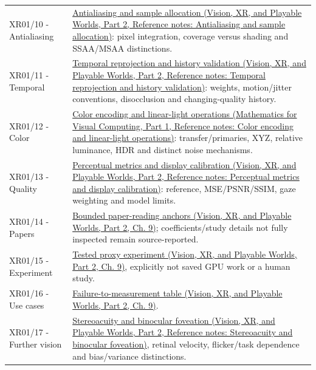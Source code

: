 {\begin{longtable}[]{@{}
  >{\raggedright\arraybackslash}p{}
  >{\raggedright\arraybackslash}p{}@{}}
XR01/10 - Antialiasing & \href{../07-Vision-XR-and-Playable-Worlds-P02/main.pdf\#appendix-4192b2bdd21e}{Antialiasing and sample allocation (Vision, XR, and Playable Worlds, Part 2, Reference notes: Antialiasing and sample allocation)}: pixel integration, coverage versus shading and SSAA/MSAA distinctions. \\
XR01/11 - Temporal & \href{../07-Vision-XR-and-Playable-Worlds-P02/main.pdf\#appendix-0727340a4428}{Temporal reprojection and history validation (Vision, XR, and Playable Worlds, Part 2, Reference notes: Temporal reprojection and history validation)}: weights, motion/jitter conventions, disocclusion and changing-quality history. \\
XR01/12 - Color & \href{../02-Mathematics-for-Visual-Computing-P01/main.pdf\#appendix-a9f83ad40792}{Color encoding and linear-light operations (Mathematics for Visual Computing, Part 1, Reference notes: Color encoding and linear-light operations)}: transfer/primaries, XYZ, relative luminance, HDR and distinct noise mechanisms. \\
XR01/13 - Quality & \href{../07-Vision-XR-and-Playable-Worlds-P02/main.pdf\#appendix-b2c1846508bf}{Perceptual metrics and display calibration (Vision, XR, and Playable Worlds, Part 2, Reference notes: Perceptual metrics and display calibration)}: reference, MSE/PSNR/SSIM, gaze weighting and model limits. \\
XR01/14 - Papers & \href{../07-Vision-XR-and-Playable-Worlds-P02/main.pdf\#04-visual-computing-ii-ch042-read-research-as-a-chain-of-questions-methods-and-bounded-conclusions}{Bounded paper-reading anchors (Vision, XR, and Playable Worlds, Part 2, Ch. 9)}; coefficients/study details not fully inspected remain source-reported. \\
XR01/15 - Experiment & \href{../07-Vision-XR-and-Playable-Worlds-P02/main.pdf\#04-visual-computing-ii-ch042-complete-numerical-and-image-space-laboratory}{Tested proxy experiment (Vision, XR, and Playable Worlds, Part 2, Ch. 9)}, explicitly not saved GPU work or a human study. \\
XR01/16 - Use cases & \href{../07-Vision-XR-and-Playable-Worlds-P02/main.pdf\#04-visual-computing-ii-ch042-diagnose-a-symptom-by-the-quantity-that-failed}{Failure-to-measurement table (Vision, XR, and Playable Worlds, Part 2, Ch. 9)}. \\
XR01/17 - Further vision & \href{../07-Vision-XR-and-Playable-Worlds-P02/main.pdf\#appendix-8dc848f14052}{Stereoacuity and binocular foveation (Vision, XR, and Playable Worlds, Part 2, Reference notes: Stereoacuity and binocular foveation)}, retinal velocity, flicker/task dependence and bias/variance distinctions. \\

\end{longtable}}
